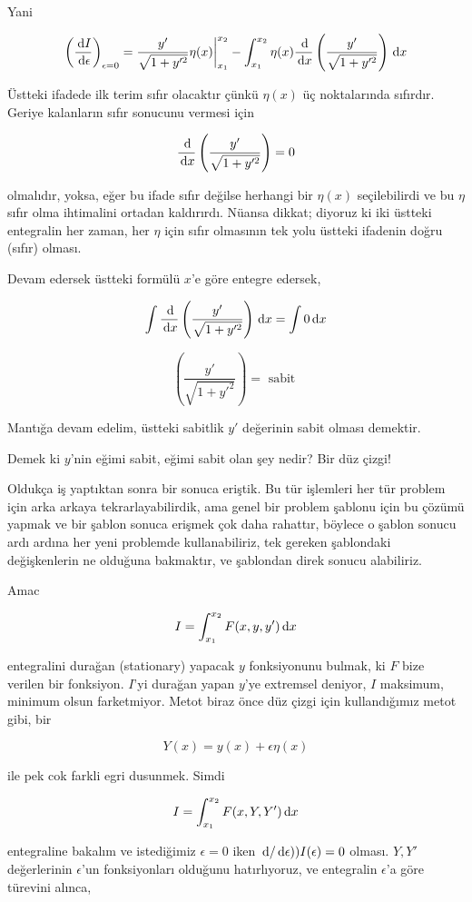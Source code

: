 \documentclass[12pt,fleqn]{article}\usepackage{../../common}
\begin{document}
Yani

$$
\left( \frac{\,\mathrm{d} I}{\,\mathrm{d} \epsilon} \right)_{\epsilon = 0} =
\frac{y'}{\sqrt{1+y'^2}} \eta(x) \bigg\vert_{x_1}^{x_2} -
\int_{x_1}^{x_2} \eta(x) \frac{\,\mathrm{d}}{\,\mathrm{d} x} \left( \frac{y'}{\sqrt{1+y'^2}} \right)
\,\mathrm{d} x
$$

Üstteki ifadede ilk terim sıfır olacaktır çünkü $\eta(x)$ üç noktalarında
sıfırdır. Geriye kalanların sıfır sonucunu vermesi için 

$$
\frac{\,\mathrm{d}}{\,\mathrm{d} x} \left( \frac{y'}{\sqrt{1+y'^2}} \right) = 0
$$

olmalıdır, yoksa, eğer bu ifade sıfır değilse herhangi bir $\eta(x)$
seçilebilirdi ve bu $\eta$ sıfır olma ihtimalini ortadan kaldırırdı. Nüansa
dikkat; diyoruz ki iki üstteki entegralin her zaman, her $\eta$ için sıfır
olmasının tek yolu üstteki ifadenin doğru (sıfır) olması.

Devam edersek üstteki formülü $x$'e göre entegre edersek, 

$$
\int \frac{\,\mathrm{d}}{\,\mathrm{d} x} \left( \frac{y'}{\sqrt{1+y'^2}} \right) \,\mathrm{d} x = \int
0 \,\mathrm{d} x 
$$

$$
 \left( \frac{y'}{\sqrt{1+y'^2}} \right) = \textrm{ sabit }
$$

Mantığa devam edelim, üstteki sabitlik $y'$ değerinin sabit olması
demektir. 

Demek ki $y$'nin eğimi sabit, eğimi sabit olan şey nedir? Bir düz çizgi! 

Oldukça iş yaptıktan sonra bir sonuca eriştik. Bu tür işlemleri her tür
problem için arka arkaya tekrarlayabilirdik, ama genel bir problem şablonu
için bu çözümü yapmak ve bir şablon sonuca erişmek çok daha rahattır,
böylece o şablon sonucu ardı ardına her yeni problemde kullanabiliriz, tek
gereken şablondaki değişkenlerin ne olduğuna bakmaktır, ve şablondan direk
sonucu alabiliriz.

Amac 

$$
I = \int_{x_1}^{x_2} F(x,y,y') \,\mathrm{d} x
$$

entegralini durağan (stationary) yapacak $y$ fonksiyonunu bulmak, ki $F$
bize verilen bir fonksiyon. $I$'yi durağan yapan $y$'ye extremsel deniyor,
$I$ maksimum, minimum olsun farketmiyor. Metot biraz önce düz çizgi için
kullandığımız metot gibi, bir

$$
Y(x) = y(x) + \epsilon \eta(x)
$$

ile pek cok farkli egri dusunmek. Simdi 

$$
I = \int_{x_1}^{x_2} F(x,Y,Y') \,\mathrm{d} x
$$

entegraline bakalım ve istediğimiz $\epsilon = 0$ iken
$ \,\mathrm{d} / \,\mathrm{d} \epsilon) ) I(\epsilon) = 0$ olması. $Y,Y'$ değerlerinin
$\epsilon$'un fonksiyonları olduğunu hatırlıyoruz, ve entegralin
$\epsilon$'a göre türevini alınca, 
\end{document}
